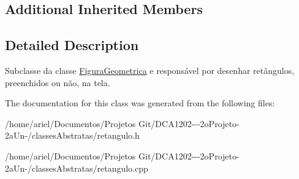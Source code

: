 \subsection*{Additional Inherited Members}


\subsection{Detailed Description}
Subclasse da classe \hyperlink{class_figura_geometrica}{Figura\+Geometrica} e responsável por desenhar retângulos, preenchidos ou não, na tela. 

The documentation for this class was generated from the following files\+:\begin{DoxyCompactItemize}
\item 
/home/ariel/\+Documentos/\+Projetos Git/\+D\+C\+A1202-\/-\/-\/2o\+Projeto-\/2a\+Un-\//classes\+Abstratas/retangulo.\+h\item 
/home/ariel/\+Documentos/\+Projetos Git/\+D\+C\+A1202-\/-\/-\/2o\+Projeto-\/2a\+Un-\//classes\+Abstratas/retangulo.\+cpp\end{DoxyCompactItemize}
